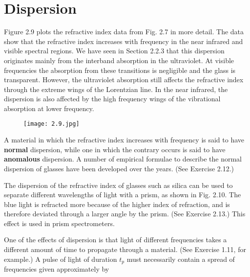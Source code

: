 \documentclass[12pt]{book}
\begin{document}
\section{Dispersion}

Figure 2.9 plots the refractive index data from Fig. 2.7 in more detail. The data show that the refractive index increases with frequency in the near infrared and visible spectral regions. We have seen in Section 2.2.3 that this dispersion originates mainly from the interband absorption in the ultraviolet. At visible frequencies the absorption from these transitions is negligible and the glass is transparent. However, the ultraviolet absorption still affects the refractive index through the extreme wings of the Lorentzian line. In the near infrared, the dispersion is also affected by the high frequency wings of the vibrational absorption at lower frequency.
\begin{figure}[htbp]
  \texttt{[image: 2.9.jpg]}\\
  \label{fig:2.9}
\end{figure}

A material in which the refractive index increases with frequency is said to have \textbf{normal} dispersion, while one in which the contrary occurs is said to have \textbf{anomalous} dispersion. A number of empirical formulae to describe the normal dispersion of glasses have been developed over the years. (See Exercise 2.12.)

The dispersion of the refractive index of glasses such as silica can be used to separate different wavelengths of light with a prism, as shown in Fig. 2.10. The blue light is refracted more because of the higher index of refraction, and is therefore deviated through a larger angle by the prism. (See Exercise 2.13.) This effect is used in prism spectrometers.

One of the effects of dispersion is that light of different frequencies takes a different amount of time to propagate through a material. (See Exercise 1.11, for example.) A pulse of light of duration $t_p$ must necessarily contain a spread of frequencies given approximately by
\end{document}
